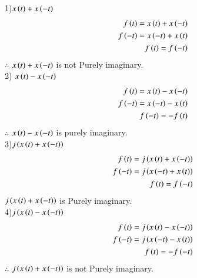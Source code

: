 \documentclass[journal,12pt,twocolumn]{IEEEtran}
\theoremstyle{remark}
\begin{document}
1)$x\left(t\right) + x\left(-t\right)$
\begin{align}
  f\left(t\right)= x\left(t\right) + x\left(-t\right)\\
  f\left(-t\right)=x\left(-t\right) + x\left(t\right)\\
  f\left(t\right)=f\left(-t\right)
\end{align}
$\therefore$ $x\left(t\right) + x\left(-t\right)$ is not Purely imaginary.\\
2) $x\left(t\right) - x\left(-t\right)$
\begin{align}
  f\left(t\right)= x\left(t\right) - x\left(-t\right)\\
  f\left(-t\right)=x\left(-t\right) - x\left(t\right)\\
  f\left(-t\right)=-f\left(t\right)
\end{align}
$\therefore$ $x\left(t\right) - x\left(-t\right)$ is purely imaginary.\\
3)$j\left(x\left(t\right) + x\left(-t\right)\right)$
\begin{align}
  f\left(t\right)=j\left(x\left(t\right) + x\left(-t\right)\right)\\
  f\left(-t\right)=j\left(x\left(-t\right) + x\left(t\right)\right)\\
  f\left(t\right)=f\left(-t\right)
\end{align}
$j\left(x\left(t\right) + x\left(-t\right)\right)$ is Purely imaginary.\\
4)$j\left(x\left(t\right) - x\left(-t\right)\right)$
\begin{align}
   f\left(t\right)=j\left(x\left(t\right) - x\left(-t\right)\right)\\
  f\left(-t\right)=j\left(x\left(-t\right) - x\left(t\right)\right)\\
  f\left(t\right)=-f\left(-t\right)
\end{align}
$\therefore$ $j\left(x\left(t\right) + x\left(-t\right)\right)$ is not Purely imaginary.\\
\end{document}

